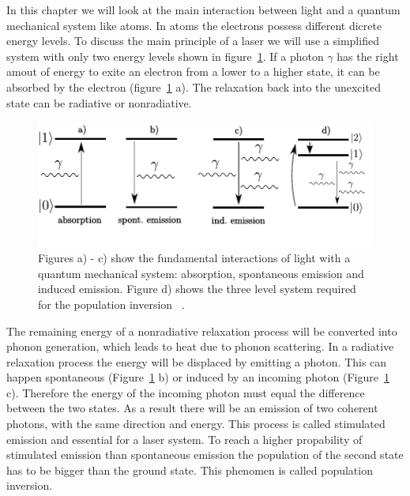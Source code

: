 In this chapter we will look at the main interaction between light and a
quantum mechanical system like atoms. In atoms the electrons possess different
dicrete energy levels. To discuss the main principle of a laser
we will use a simplified system with only two energy levels shown in figure~\ref{fig:twolevelsystem}.
If a photon $\gamma$ has the right amout of energy to exite an electron
from a lower to a higher state, it can be absorbed
by the electron (figure~\ref{fig:twolevelsystem} a).
The relaxation back into the unexcited state can be radiative or
nonradiative.
\begin{figure}
  \centering
  \includegraphics[width = \textwidth]{Pics/energyscheme.pdf}
  \caption{Figures a) - c) show the fundamental interactions of light with a
  quantum mechanical system: absorption, spontaneous emission and induced emission.
  Figure d) shows the three level system required for the population inversion
 ~\cite{steven}.}%
  \label{fig:twolevelsystem}
\end{figure}
The remaining energy of a nonradiative relaxation process will be converted into
phonon generation, which leads to heat due to phonon scattering.
In a radiative relaxation process the energy will
be displaced by emitting a photon. This can happen spontaneous (Figure~\ref{fig:twolevelsystem} b)
or induced by an incoming photon (Figure~\ref{fig:twolevelsystem} c).
Therefore the energy of the incoming photon must equal the difference between the
two states. As a result there will be an emission of two coherent photons,
with the same direction and energy. This process is called stimulated emission
and essential for a laser system.
To reach a higher propability of stimulated emission
than spontaneous emission the population of the second state has to be bigger
than the ground state. This phenomen is called population inversion.


